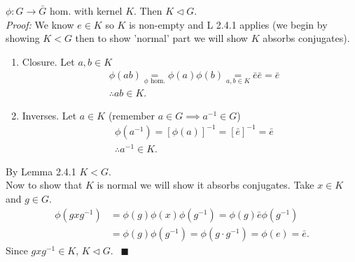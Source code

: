 \begin{lemma}
$\phi:G\rightarrow \bar{G}$ hom. with kernel $K$. Then $K\triangleleft G$. \steezybreak\\

\noindent \textit{Proof:} We know $e\in K$ so $K$ is non-empty and L 2.4.1 applies (we begin by showing $K<G$ then to show 'normal' part we will show $K$ absorbs conjugates).
\begin{enumerate}[label=\roman*)]
    \item Closure. Let $a,b\in K$
    \begin{align}
        &\phi(ab)\underset{\phi \text{ hom.}}{=}\phi(a)\phi(b)\underset{a,b\in K}{=} \bar{e}\bar{e}=\bar{e} \nonumber \\
        &\therefore ab\in K. \nonumber 
    \end{align}
    \item Inverses. Let $a\in K$  (remember $a\in G \implies a^{-1}\in G$)
    \begin{align}
        &\phi(a^{-1})=[\phi(a)]^{-1}=[\bar{e}]^{-1}=\bar{e}\nonumber \\
        &\therefore a^{-1}\in K. \nonumber 
    \end{align}
\end{enumerate}
By Lemma 2.4.1 $K<G$. \\
Now to show that $K$ is normal we will show it absorbs conjugates. Take $x\in K$ and $g\in G$.
\begin{align}
    \phi(gxg^{-1})&= \phi(g)\phi(x)\phi(g^{-1}) = \phi(g)\bar{e}\phi(g^{-1})\nonumber \\
    &= \phi(g)\phi(g^{-1})=\phi(g\cdot g^{-1})= \phi(e)=\bar{e}. \nonumber
\end{align}
Since $gxg^{-1}\in K$, $K\triangleleft G$. $\ \ \blacksquare$
\end{lemma}

